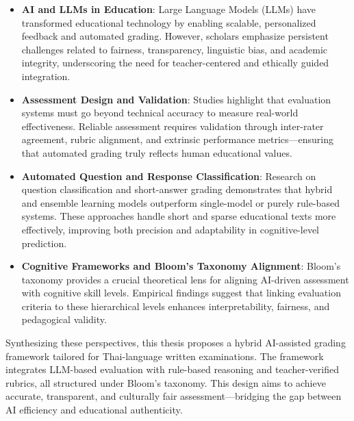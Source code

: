 \begin{itemize}
    \item \textbf{AI and LLMs in Education}: Large Language Models (LLMs) have transformed educational technology by enabling scalable, personalized feedback and automated grading. However, scholars emphasize persistent challenges related to fairness, transparency, linguistic bias, and academic integrity, underscoring the need for teacher-centered and ethically guided integration.
    \item \textbf{Assessment Design and Validation}: Studies highlight that evaluation systems must go beyond technical accuracy to measure real-world effectiveness. Reliable assessment requires validation through inter-rater agreement, rubric alignment, and extrinsic performance metrics—ensuring that automated grading truly reflects human educational values.
    \item \textbf{Automated Question and Response Classification}: Research on question classification and short-answer grading demonstrates that hybrid and ensemble learning models outperform single-model or purely rule-based systems. These approaches handle short and sparse educational texts more effectively, improving both precision and adaptability in cognitive-level prediction.
    \item \textbf{Cognitive Frameworks and Bloom’s Taxonomy Alignment}: Bloom’s taxonomy provides a crucial theoretical lens for aligning AI-driven assessment with cognitive skill levels. Empirical findings suggest that linking evaluation criteria to these hierarchical levels enhances interpretability, fairness, and pedagogical validity.
\end{itemize}

Synthesizing these perspectives, this thesis proposes a hybrid 
AI-assisted grading framework tailored for Thai-language written 
examinations. The framework integrates LLM-based evaluation with 
rule-based reasoning and teacher-verified rubrics, all structured 
under Bloom’s taxonomy. This design aims to achieve accurate, 
transparent, and culturally fair assessment—bridging the gap 
between AI efficiency and educational authenticity.
